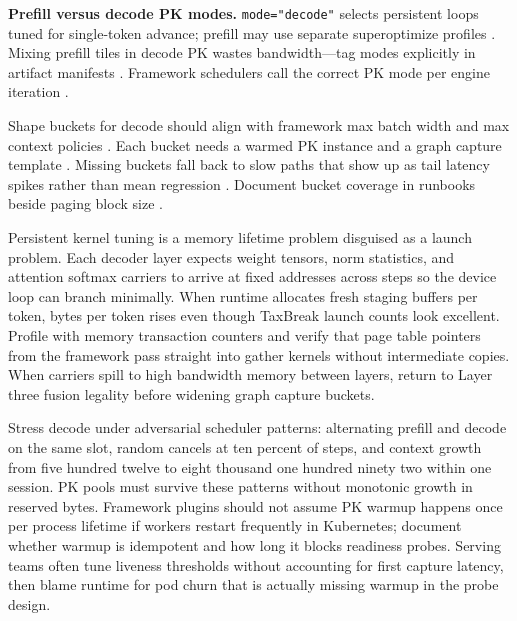 \textbf{Prefill versus decode PK modes.} \texttt{mode="decode"} selects persistent loops tuned for single-token advance; prefill may use separate superoptimize profiles \citep{patel2025llminference,dao2022flashattention,dao2023flashdecoding,yirage2026,chen2020compilerbasedhardw,kwon2023vllm,memoryfloor2026,taxbreak2026,nvidia2024cudagraphs,liu2024deepseekv3,semianalysis2024tma,amd2024xdna,amd2024aie,dao2023flashdecoding,nvidia2022hopper,dlbook}. Mixing prefill tiles in decode PK wastes bandwidth---tag modes explicitly in artifact manifests \citep{yirage2026,chen2020compilerbasedhardw,patel2025llminference,taxbreak2026,memoryfloor2026,dlbook}. Framework schedulers call the correct PK mode per engine iteration \citep{kwon2023vllm,patel2025llminference,yirage2026,chen2020compilerbasedhardw,memoryfloor2026,taxbreak2026,nvidia2024cudagraphs,dlbook}.

Shape buckets for decode should align with framework max batch width and max context policies \citep{kwon2023vllm,nvidia2024cudagraphs,yirage2026,chen2020compilerbasedhardw,patel2025llminference,dlbook}. Each bucket needs a warmed PK instance and a graph capture template \citep{memoryfloor2026,nvidia2024cudagraphs,yirage2026,chen2020compilerbasedhardw,patel2025llminference,dlbook}. Missing buckets fall back to slow paths that show up as tail latency spikes rather than mean regression \citep{patel2025llminference,memoryfloor2026,yirage2026,chen2020compilerbasedhardw,kwon2023vllm,dlbook}. Document bucket coverage in runbooks beside paging block size \citep{kwon2023vllm,patel2025llminference,yirage2026,chen2020compilerbasedhardw,dlbook}.

Persistent kernel tuning is a memory lifetime problem disguised as a launch problem. Each decoder layer expects weight tensors, norm statistics, and attention softmax carriers to arrive at fixed addresses across steps so the device loop can branch minimally. When runtime allocates fresh staging buffers per token, bytes per token rises even though TaxBreak launch counts look excellent. Profile with memory transaction counters and verify that page table pointers from the framework pass straight into gather kernels without intermediate copies. When carriers spill to high bandwidth memory between layers, return to Layer three fusion legality before widening graph capture buckets.

Stress decode under adversarial scheduler patterns: alternating prefill and decode on the same slot, random cancels at ten percent of steps, and context growth from five hundred twelve to eight thousand one hundred ninety two within one session. PK pools must survive these patterns without monotonic growth in reserved bytes. Framework plugins should not assume PK warmup happens once per process lifetime if workers restart frequently in Kubernetes; document whether warmup is idempotent and how long it blocks readiness probes. Serving teams often tune liveness thresholds without accounting for first capture latency, then blame runtime for pod churn that is actually missing warmup in the probe design.

